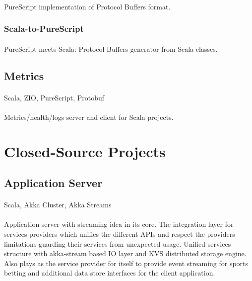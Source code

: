 \paragraph{}
PureScript implementation of Protocol Buffers format.

\subsubsection{Scala-to-PureScript}
\paragraph{}
PureScript meets Scala: Protocol Buffers generator from Scala classes.

\subsection{Metrics}
\paragraph{} Scala, ZIO, PureScript, Protobuf
\paragraph{}
Metrics/health/logs server and client for Scala projects.

\section{Closed-Source Projects}

\subsection{Application Server}
\paragraph{} Scala, Akka Cluster, Akka Streams
\paragraph{}
Application server with streaming idea in its core. The integration layer for services providers which unifies the different APIs and respect the providers limitations guarding their services from unexpected usage. Unified services structure with akka-stream based IO layer and KVS distributed storage engine. Also plays as the service provider for itself to provide event streaming for sports betting and additional data store interfaces for the client application.

